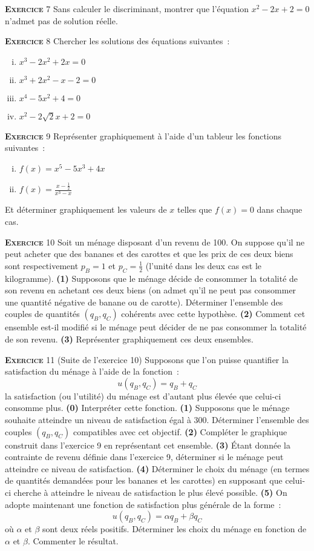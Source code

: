 \documentclass[10pt,a4paper,notitlepage]{article}
\newcommand{\exercice}[1]{\textsc{\textbf{Exercice}} #1}
\begin{document}
\bigskip

\exercice{7} Sans calculer le discriminant, montrer que l'équation
$x^2-2x+2 = 0$ n'admet pas de solution réelle.

\bigskip

\exercice{8} Chercher les solutions des équations suivantes :
\begin{enumerate}[(i)]
\item $x^3-2x^2+2x = 0$
\item $x^3+2x^2-x-2 = 0$
\item $x^4-5x^2+4 = 0$
\item $x^2 - 2\sqrt{2}x + 2 = 0$
\end{enumerate}

\bigskip

\exercice{9} Représenter graphiquement à l'aide d'un tableur les
fonctions suivantes :
\begin{enumerate}[(i)]
\item $f(x) = x^5- 5x^3 + 4x$
\item $f(x) = \frac{x-\frac{1}{2}}{x^3-x}$
\end{enumerate}
Et déterminer graphiquement les valeurs de $x$ telles que $f(x)=0$
dans chaque cas.

\bigskip

\exercice{10} Soit un ménage disposant d'un revenu de 100. On suppose
qu'il ne peut acheter que des bananes et des carottes et que les prix
de ces deux biens sont respectivement $p_B= 1$ et $p_C = \frac{1}{2}$
(l'unité dans les deux cas est le kilogramme). \textbf{(1)} Supposons
que le ménage décide de consommer la totalité de son revenu en
achetant ces deux biens (on admet qu'il ne peut pas consommer une
quantité négative de banane ou de carotte). Déterminer l'ensemble des
couples de quantités $(q_B, q_C)$ cohérents avec cette
hypothèse. \textbf{(2)} Comment cet ensemble est-il modifié si le
ménage peut décider de ne pas consommer la totalité de son
revenu. \textbf{(3)} Représenter graphiquement ces deux ensembles.

\bigskip

\exercice{11} (Suite de l'exercice 10) Supposons que l'on puisse
quantifier la satisfaction du ménage à l'aide de la fonction :
\[
u(q_B, q_C) = q_B + q_C
\]
la satisfaction (ou l'utilité) du ménage est d'autant plus élevée que
celui-ci consomme plus. \textbf{(0)} Interpréter cette
fonction. \textbf{(1)} Supposons que le ménage souhaite atteindre un
niveau de satisfaction égal à 300. Déterminer l'ensemble des couples
$(q_B, q_C)$ compatibles avec cet objectif. \textbf{(2)} Compléter le
graphique construit dans l'exercice 9 en représentant cet ensemble.
\textbf{(3)} Étant donnée la contrainte de revenu définie dans
l'exercice 9, déterminer si le ménage peut atteindre ce niveau de
satisfaction. \textbf{(4)} Déterminer le choix du ménage (en termes de
quantités demandées pour les bananes et les carottes) en supposant que
celui-ci cherche à atteindre le niveau de satisfaction le plus élevé
possible. \textbf{(5)} On adopte maintenant une fonction de
satisfaction plus générale de la forme :
\[
u(q_B, q_C) = \alpha q_B + \beta q_C
\]
où $\alpha$ et $\beta$ sont deux réels positifs. Déterminer les choix
du ménage en fonction de $\alpha$ et $\beta$. Commenter le résultat.
\end{document}
